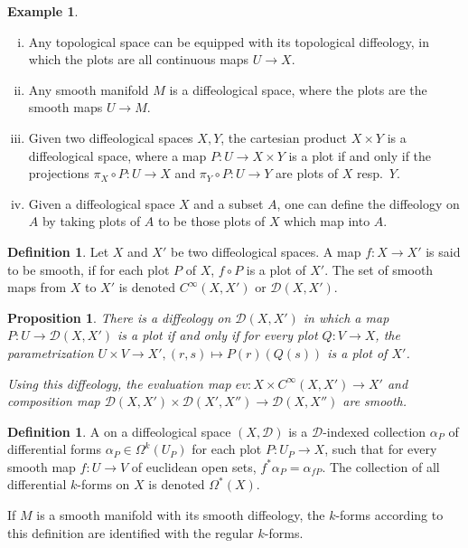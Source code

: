 \documentclass{scrartcl}
\let\emph\relax
\theoremstyle{plain}
\newtheorem{proposition}[theorem]{Proposition}
\theoremstyle{definition}
\newtheorem{definition}[theorem]{Definition}
\newtheorem{example}[theorem]{Example}
\newcommand{\comp}{\mathbin{\circ}}
\begin{document}
\begin{example}\begin{enumerate}[(i)]
    \item Any topological space can be equipped with its topological diffeology, in which the plots are all continuous maps $U\to X$.
    \item Any smooth manifold $M$ is a diffeological space, where the plots are the smooth maps $U\to M$.
    \item Given two diffeological spaces $X, Y$, the cartesian product $X\times Y$ is a diffeological space, where a map $P\colon U\to X\times Y$ is a plot if and only if the projections $\pi_X \comp P \colon U\to X$ and $\pi_Y\comp P\colon U\to Y$ are plots of $X$ resp.\ $Y$.
    \item Given a diffeological space $X$ and a subset $A$, one can define the diffeology on $A$ by taking plots of $A$ to be those plots of $X$ which map into $A$.
\end{enumerate}\end{example}
\begin{definition}
    Let $X$ and $X'$ be two diffeological spaces. A map $f\colon X\to X'$ is said to be smooth, if for each plot $P$ of $X$, $f\comp P$ is a plot of $X'$. The set of smooth maps from $X$ to $X'$ is denoted $C^\infty(X, X')$ or $\mathcal D(X, X')$.
\end{definition}
\begin{proposition}
    There is a diffeology on $\mathcal D(X, X')$ in which a map $P\colon U\to \mathcal D(X, X')$ is a plot if and only if for every plot $Q\colon V\to X$, the parametrization $U\times V\to X', (r,s)\mapsto P(r)(Q(s))$ is a plot of $X'$. 
    
    Using this diffeology, the evaluation map $ev\colon X\times C^\infty(X, X') \to X'$ and composition map $\mathcal D(X, X')\times \mathcal D(X', X'')\to \mathcal D(X, X'')$ are smooth.
\end{proposition}

\begin{definition}
    A \emph{differential $k$-form} on a diffeological space $(X,\mathcal D)$ is a $\mathcal D$-indexed collection $\alpha_P$ of differential forms $\alpha_P\in \Omega^k(U_P)$ for each plot $P\colon U_P\to X$, such that for every smooth map $f\colon U\to V$ of euclidean open sets, $f^*\alpha_P = \alpha_{fP}$. The collection of all differential $k$-forms on $X$ is denoted $\Omega^*(X)$.
\end{definition}
If $M$ is a smooth manifold with its smooth diffeology, the $k$-forms according to this definition are identified with the regular $k$-forms. 
\end{document}
